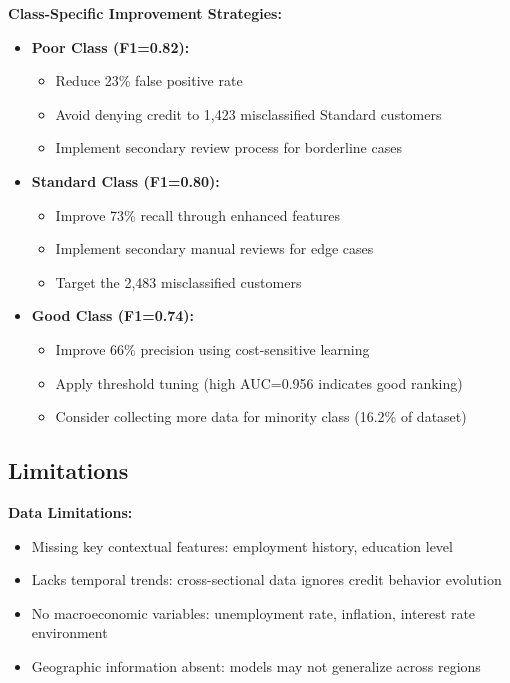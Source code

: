 \documentclass[11pt, a4paper]{article}
\begin{document}
\textbf{Class-Specific Improvement Strategies:}
\begin{itemize}
    \item \textbf{Poor Class (F1=0.82):}
    \begin{itemize}
        \item Reduce 23\% false positive rate
        \item Avoid denying credit to 1,423 misclassified Standard customers
        \item Implement secondary review process for borderline cases
    \end{itemize}
    
    \item \textbf{Standard Class (F1=0.80):}
    \begin{itemize}
        \item Improve 73\% recall through enhanced features
        \item Implement secondary manual reviews for edge cases
        \item Target the 2,483 misclassified customers
    \end{itemize}
    
    \item \textbf{Good Class (F1=0.74):}
    \begin{itemize}
        \item Improve 66\% precision using cost-sensitive learning
        \item Apply threshold tuning (high AUC=0.956 indicates good ranking)
        \item Consider collecting more data for minority class (16.2\% of dataset)
    \end{itemize}
\end{itemize}

\subsection{Limitations}

\textbf{Data Limitations:}
\begin{itemize}
    \item Missing key contextual features: employment history, education level
    \item Lacks temporal trends: cross-sectional data ignores credit behavior evolution
    \item No macroeconomic variables: unemployment rate, inflation, interest rate environment
    \item Geographic information absent: models may not generalize across regions
\end{itemize}
\end{document}
